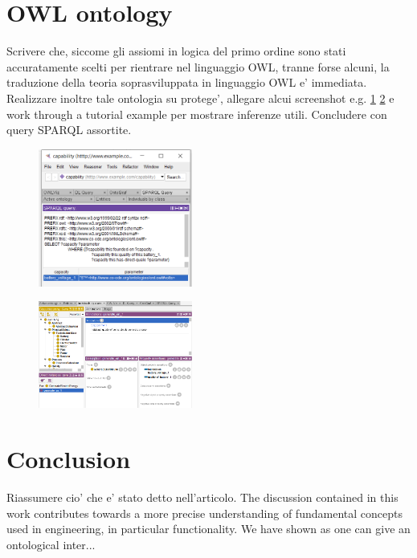 \documentclass[sw]{iosart2x}
\newcommand{\TODO}[1]{{\color{red} #1}}
\newcommand{\TODOinline}[1]{{\color{red} #1}}
\begin{document}
{\section{\TODOinline{OWL ontology}}\label{sec:appendice}
\TODO{Scrivere che, siccome gli assiomi in logica del primo ordine sono stati accuratamente scelti per rientrare nel linguaggio OWL, tranne forse alcuni, la traduzione della teoria soprasviluppata in linguaggio OWL e' immediata. 
Realizzare inoltre tale ontologia su protege', allegare alcui screenshot e.g. \ref{fig:screen_query} \ref{fig:screen_entities} e work through a tutorial example per mostrare inferenze utili. Concludere con query SPARQL assortite.}
\begin{figure}
  \centering
  \includegraphics[width=0.45\textwidth]{query_screenshot.PNG}
  \caption{\label{fig:screen_query}}
\end{figure}

\begin{figure}
  \centering
  \includegraphics[width=0.45\textwidth]{entities_screenshot.PNG}
  \caption{\label{fig:screen_entities}}
\end{figure}

\section{Conclusion}\label{sec:conc}
\TODO{Riassumere cio' che e' stato detto nell'articolo.} %
\TODO{The discussion contained in this work contributes towards a more precise understanding of fundamental concepts used in engineering, in particular functionality.
We have shown as one can give an ontological inter...}


}
\end{document}
